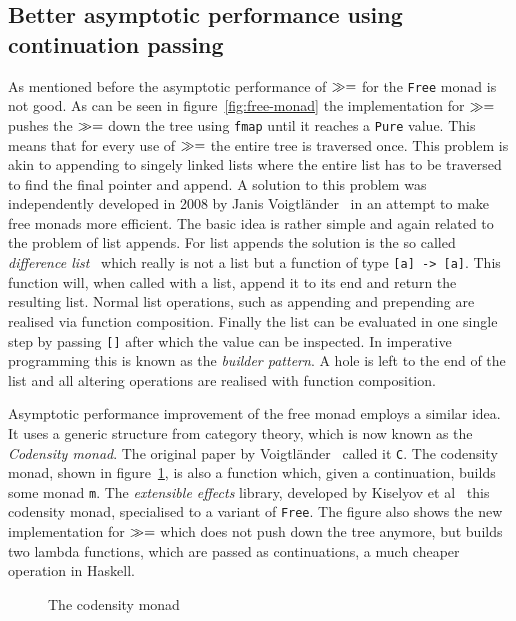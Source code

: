 \subsection{Better asymptotic performance using continuation passing}

As mentioned before the asymptotic performance of $\gg=$ for the
\texttt{Free} monad is not good. As can be seen in figure~\ref{fig:free-monad}
the implementation for $\gg=$ pushes the $\gg=$ down the tree using
\texttt{fmap} until it reaches a \texttt{Pure} value. This means that for every
use of $\gg=$ the entire tree is traversed once. This problem is akin to
appending to singely linked lists where the entire list has to be traversed to
find the final pointer and append. A solution to this problem was independently
developed in 2008 by Janis Voigtländer~\cite{asymptotic-performance-improvement}
in an attempt to make free monads more efficient. The basic idea is rather
simple and again related to the problem of list appends. For list appends the
solution is the so called \emph{difference list}~\cite{difference-list} which
really is not a list but a function of type \texttt{[a] -> [a]}. This function
will, when called with a list, append it to its end and return the resulting
list. Normal list operations, such as appending and prepending are realised via
function composition. Finally the list can be evaluated in one single step by
passing \texttt{[]} after which the value can be inspected. In imperative
programming this is known as the \emph{builder pattern}. A hole is left to the
end of the list and all altering operations are realised with function
composition.

Asymptotic performance improvement of the free monad employs a similar idea. It
uses a generic structure from category theory, which is now known as the
\emph{Codensity monad}. The original paper by
Voigtländer~\cite{asymptotic-performance-improvement} called it \texttt{C}. The
codensity monad, shown in figure~\ref{fig:codensity-monad}, is also a function
which, given a continuation, builds some monad \texttt{m}. The \emph{extensible
  effects} library, developed by Kiselyov et al~\cite{extensible-effects} this
codensity monad, specialised to a variant of \texttt{Free}. The figure also
shows the new implementation for $\gg=$ which does not push down the tree
anymore, but builds two lambda functions, which are passed as continuations, a
much cheaper operation in Haskell.

\begin{figure}
  
  \caption{The codensity monad}
  \label{fig:codensity-monad}
\end{figure}
